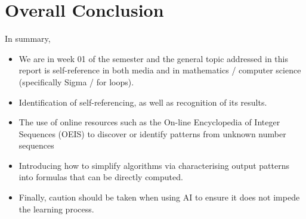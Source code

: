 \documentclass[12pt]{article}
\begin{document}

\newpage

\section{Overall Conclusion}

In summary,

\begin{itemize}

\item
  We are in week 01 of the semester and the general topic addressed in this report is self-reference in both media and in mathematics / computer science (specifically Sigma / for loops).

\item
  Identification of self-referencing, as well as recognition of its results.

\item
  The use of online resources such as the On-line Encyclopedia of Integer Sequences (OEIS) to discover or identify patterns from unknown number sequences

\item
  Introducing how to simplify algorithms via characterising output patterns into formulas that can be directly computed.

\item
  Finally, caution should be taken when using AI to ensure it does not impede the learning process.

\end{itemize}

\end{document}
